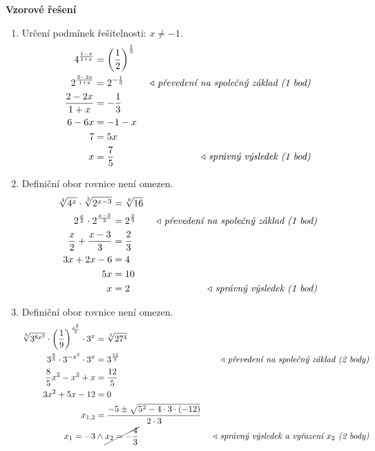 \begin{center}
\Large\textbf{Vzorové řešení}\normalsize
\begin{enumerate}
    \item Určení podmínek řešitelnosti: $x\neq -1$.
    \begin{align*}
        \begin{aligned}
            4^{\frac{1-x}{1+x}}&=\left(\frac{1}{2}\right)^{\frac{1}{3}} & \\
            2^{\frac{2-2x}{1+x}}&=2^{-\frac{1}{3}} & \text{\rightnote{převedení na společný základ (1 bod)}}\\
            \frac{2-2x}{1+x}&=-\frac{1}{3} & \\
            6-6x&=-1-x & \\
            7&=5x & \\
            x&=\frac{7}{5} & \text{\rightnote{správný výsledek (1 bod)}}
        \end{aligned}
    \end{align*}
    \item Definiční obor rovnice není omezen.
    \begin{align*}
        \begin{aligned}
            \sqrt[4]{4^x}\cdot \sqrt[3]{2^{x-3}}&=\sqrt[6]{16} & \\
            2^{\frac{x}{2}}\cdot 2^{\frac{x-3}{3}}&=2^{\frac{2}{3}} & \text{\rightnote{převedení na společný základ (1 bod)}}\\
            \frac{x}{2}+\frac{x-3}{3}&=\frac{2}{3} & \\
            3x+2x-6&=4 & \\
            5x&=10 & \\
            x&=2 & \text{\rightnote{správný výsledek (1 bod)}}
        \end{aligned}
    \end{align*}
    \item Definiční obor rovnice není omezen.
    \begin{align*}
        \begin{aligned}
            \sqrt[5]{3^{8x^2}}\cdot\left(\frac{1}{9}\right)^{\frac{x^2}{2}}\cdot 3^x&=\sqrt[5]{27^4} & \\
            3^{\frac{8}{5}}\cdot 3^{-x^2}\cdot 3^x&=3^{\frac{12}{5}}& \text{\rightnote{převedení na společný základ (2 body)}}\\
            \frac{8}{5}x^2-x^2+x&=\frac{12}{5} & \\
            3x^2+5x-12&=0 & \\
            x_{1,2}&=\frac{-5\pm\sqrt{5^2-4\cdot 3\cdot (-12)}}{2\cdot 3} & \\
            x_1=-3 &\land \cancel{x_2=-\frac{4}{3}} & \text{\rightnote{správný výsledek a vyřazení $x_2$ (2 body)}} \\
        \end{aligned}
    \end{align*}
\end{enumerate}
\end{center}